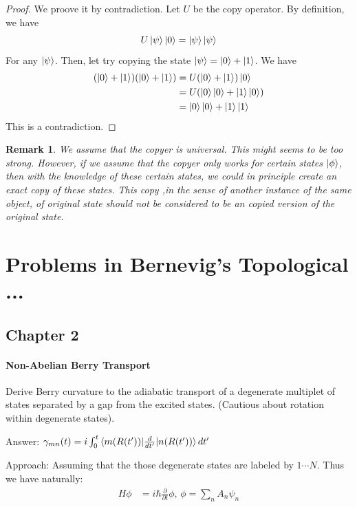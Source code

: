 \documentclass{article}
\numberwithin{equation}{subsection} %
\newtheorem{remark}{Remark}[section]
\theoremstyle{definition}
\begin{document}
    \begin{proof}
    We proove it by contradiction. Let $U$ be the copy operator. By definition,
    we have
    $$   U \ket{\psi}\ket{0} = \ket{\psi}\ket{\psi}$$
    For any $\ket{\psi}$.
    Then, let try copying the state $\ket{\psi} = \ket{0} + \ket{1}$. We have
    \begin{align*}
        (\ket{0}+\ket{1})(\ket{0}+\ket{1}) &= U (\ket{0}+\ket{1})\ket{0} \\
        &= U (\ket{0}\ket{0} + \ket{1}\ket{0} ) \\
        &= \ket{0}\ket{0} + \ket{1}\ket{1} \\
    \end{align*}
    This is a contradiction.
    \end{proof}
    \begin{remark}
        We assume that the copyer is universal. This might seems to be too
        strong. However, if we assume that the copyer only
        works for certain states $\ket{\phi}$, then with the knowledge
        of these certain states, we could in principle create an exact copy
        of these states. This copy ,in the sense of another instance of the
        same object, of original state should not be considered to be an
        copied version of the original state.
    \end{remark}
    
\section{Problems in Bernevig's Topological ...}

    \subsection{Chapter 2}
    \paragraph{Non-Abelian Berry Transport}
    Derive Berry curvature to the adiabatic transport of a degenerate
    multiplet of states separated by a gap from the excited states.
    (Cautious about rotation within degenerate states).

    Answer: $\gamma_{mn}(t) = i \int_0^t \braket{m(R(t'))|\frac{d}{dt'}|n(R(t'))}dt'$

    Approach:
    Assuming that the those degenerate states are labeled by $1\cdots N$. 
    Thus we have naturally:
	\begin{align}
            H\phi &=i\hbar\frac{\partial}{\partial t}\phi\text{,  }
        \phi = \sum_n A_n \psi_n
    \end{align}
    
\end{document}
